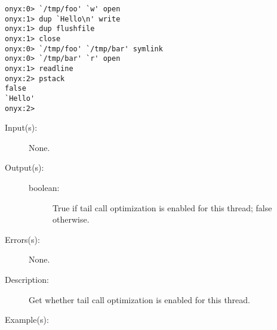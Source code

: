 \begin{description}
\begin{description}
\begin{verbatim}
onyx:0> `/tmp/foo' `w' open
onyx:1> dup `Hello\n' write
onyx:1> dup flushfile
onyx:1> close
onyx:0> `/tmp/foo' `/tmp/bar' symlink
onyx:0> `/tmp/bar' `r' open
onyx:1> readline
onyx:2> pstack
false
`Hello'
onyx:2>
		\end{verbatim}
	\end{description}
\label{systemdict:tailopt}
\item[{\onyxop{--}{tailopt}{boolean}}: ]
	\begin{description}\item[]
	\item[Input(s): ] None.
	\item[Output(s): ]
		\begin{description}\item[]
		\item[boolean: ]
			True if tail call optimization is enabled for this
			thread; false otherwise.
		\end{description}
	\item[Errors(s): ] None.
	\item[Description: ]
		Get whether tail call optimization is enabled for this thread.
	\item[Example(s): ]\begin{verbatim}


\end{verbatim}
\end{description}
\end{description}
